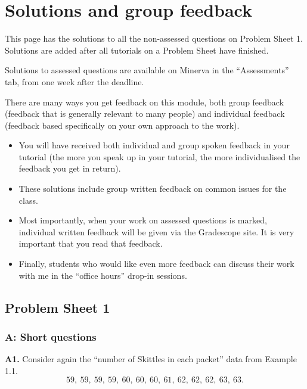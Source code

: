 \documentclass[
  a4paper,
]{book}
\newif\ifcomm\commtrue
\theoremstyle{definition}
\theoremstyle{definition}
\theoremstyle{definition}
\theoremstyle{definition}
\theoremstyle{remark}
\begin{document}
\commtrue

\hypertarget{solutions}{%
\chapter*{Solutions and group feedback}\label{solutions}}

This page has the solutions to all the non-assessed questions on Problem Sheet 1. Solutions are added after all tutorials on a Problem Sheet have finished.

Solutions to assessed questions are available on Minerva in the ``Assessments'' tab, from one week after the deadline.

There are many ways you get feedback on this module, both group feedback (feedback that is generally relevant to many people) and individual feedback (feedback based specifically on your own approach to the work).

\begin{itemize}
\item
  You will have received both individual and group spoken feedback in your tutorial (the more you speak up in your tutorial, the more individualised the feedback you get in return).
\item
  These solutions include group written feedback on common issues for the class.
\item
  Most importantly, when your work on assessed questions is marked, individual written feedback will be given via the Gradescope site. It is very important that you read that feedback.
\item
  Finally, students who would like even more feedback can discuss their work with me in the ``office hours'' drop-in sessions.
\end{itemize}

\hypertarget{P1-solutions}{%
\section*{Problem Sheet 1}\label{P1-solutions}}

\hypertarget{P1-short-solutions}{%
\subsection*{A: Short questions}\label{P1-short-solutions}}

\textbf{A1.} Consider again the ``number of Skittles in each packet'' data from Example 1.1.
\[ 59, \ 59, \ 59, \ 59, \ 60, \ 60, \ 60, \ 61, \ 62, \ 62, \ 62, \ 63, \ 63 .\]
\end{document}
